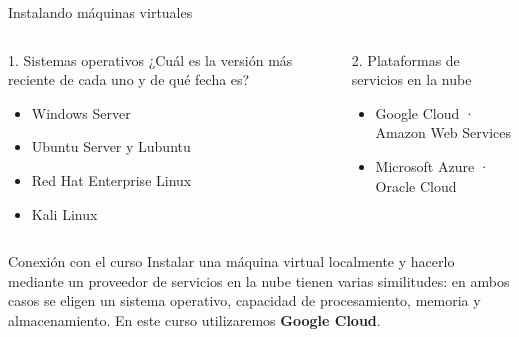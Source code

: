 \documentclass[aspectratio=169,10pt,c]{beamer}
\begin{document}
\begin{frame}{Instalando máquinas virtuales}
\begin{columns}[T,onlytextwidth]
\begin{block}{1. Sistemas operativos}
\small ¿Cuál es la versión más reciente de cada uno y de qué fecha es?
\begin{itemize}\setlength\itemsep{2pt}\small
  \item Windows Server
  \item Ubuntu Server y Lubuntu
  \item Red Hat Enterprise Linux
  \item Kali Linux
\end{itemize}
\end{block}
\begin{block}{2. Plataformas de servicios en la nube}
\begin{itemize}\setlength\itemsep{2pt}\small
  \item Google Cloud · Amazon Web Services
  \item Microsoft Azure · Oracle Cloud
\end{itemize}
\end{block}
\end{columns}
\vspace{0.25cm}
\begin{exampleblock}{Conexión con el curso}
\small Instalar una máquina virtual localmente y hacerlo mediante un proveedor de servicios en la nube tienen varias similitudes: en ambos casos se eligen un sistema operativo, capacidad de procesamiento, memoria y almacenamiento. En este curso utilizaremos \textbf{Google Cloud}.
\end{exampleblock}
\end{frame}
\end{document}
